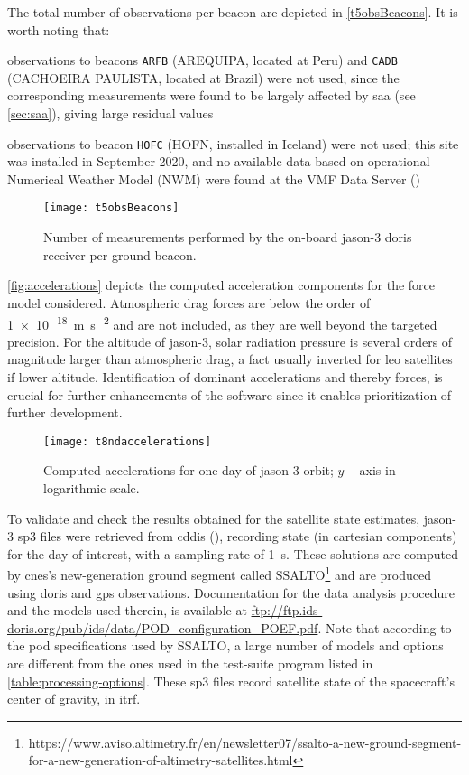 The total number of observations per beacon are depicted in \autoref{t5obsBeacons}. 
It is worth noting that:
\begin{description}
  \item observations to beacons \texttt{ARFB} (AREQUIPA, located at Peru) and 
    \texttt{CADB} (CACHOEIRA PAULISTA, located at Brazil) were not used, 
    since the corresponding measurements were found to be largely affected by 
    \gls{saa} (see \autoref{sec:saa}), giving large residual values
  \item observations to beacon \texttt{HOFC} (HOFN, installed in Iceland) were not used; this site was installed in 
    September 2020, and no available data based on operational Numerical Weather Model (NWM) 
    were found at the VMF Data Server (\cite{vmf3DataServer})
\end{description}
\begin{figure}
    \centering
    \texttt{[image: t5obsBeacons]}
    \caption{Number of measurements performed by the on-board \gls{jason}-3 \gls{doris} receiver per ground beacon.}
    \label{fig:obsPerBeacon}
\end{figure}

\autoref{fig:accelerations} depicts the computed acceleration components for the 
force model considered. Atmospheric drag forces are below the order of \SI{1e-18}{\meter\per\second\squared} 
and are not included, as they are well beyond the targeted precision. For the altitude 
of \gls{jason}-3, solar radiation pressure is several orders of magnitude larger than 
atmospheric drag, a fact usually inverted for \gls{leo} satellites if lower 
altitude. Identification of dominant accelerations and thereby forces, is crucial 
for further enhancements of the software since it enables prioritization of further 
development.

\begin{figure}
    \centering
    \texttt{[image: t8ndaccelerations]}
    \caption{Computed accelerations for one day of \gls{jason}-3 orbit; $y-$axis in logarithmic scale.}
    \label{fig:accelerations}
\end{figure}

To validate and check the results obtained for the satellite state estimates, 
\gls{jason}-3 sp3 files were retrieved from \gls{cddis} (\cite{Noll2010}), recording 
state (in cartesian components) for the day of interest, with a sampling rate of 
\SI{1}{\second}. These solutions are computed by \gls{cnes}'s new-generation ground segment 
called SSALTO\footnote{https://www.aviso.altimetry.fr/en/newsletter07/ssalto-a-new-ground-segment-for-a-new-generation-of-altimetry-satellites.html} 
and are produced using \gls{doris} and \gls{gps} observations. Documentation 
for the data analysis procedure and the models used therein, is available at 
\url{ftp://ftp.ids-doris.org/pub/ids/data/POD_configuration_POEF.pdf}. Note that 
according to the \gls{pod} specifications used by SSALTO, a large number of models 
and options are different from the ones used in the test-suite program listed in 
\autoref{table:processing-options}. These sp3 files record satellite state of the 
spacecraft's center of gravity, in \gls{itrf}.

